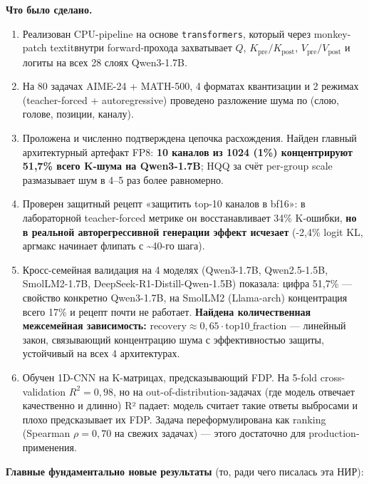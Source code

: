\documentclass[a4paper,12pt]{article}
\begin{document}
\textbf{Что было сделано.}
\begin{enumerate}[label=\arabic*.,leftmargin=*]
\item Реализован CPU-pipeline на основе \texttt{transformers}, который
  через monkey-patch textit{внутри}
  forward-прохода захватывает $Q$, $K_\text{pre}/K_\text{post}$,
  $V_\text{pre}/V_\text{post}$ и логиты на всех 28 слоях Qwen3-1.7B.
\item На 80 задачах AIME-24 + MATH-500, 4 форматах квантизации и
  2 режимах (teacher-forced + autoregressive) проведено разложение
  шума по (слою, голове, позиции, каналу).
\item Проложена и численно подтверждена цепочка расхождения. Найден
  главный архитектурный артефакт FP8: \textbf{10 каналов из 1024 (1\%)
  концентрируют 51,7\% всего K-шума на Qwen3-1.7B}; HQQ за счёт
  per-group scale размазывает шум в 4--5 раз более равномерно.
\item Проверен защитный рецепт «защитить top-10 каналов в bf16»: в
  лабораторной teacher-forced метрике он восстанавливает 34\% K-ошибки,
  \textbf{но в реальной авторегрессивной генерации эффект исчезает} (-2,4\%
  logit KL, аргмакс начинает флипать с \textasciitilde 40-го шага).
\item Кросс-семейная валидация на 4 моделях (Qwen3-1.7B, Qwen2.5-1.5B,
  SmolLM2-1.7B, DeepSeek-R1-Distill-Qwen-1.5B) показала: цифра 51,7\% ---
  свойство конкретно Qwen3-1.7B, на SmolLM2 (Llama-arch) концентрация
  всего 17\% и рецепт почти не работает. \textbf{Найдена количественная
  межсемейная зависимость:}
  \(\text{recovery} \approx 0{,}65 \cdot \text{top10\_fraction}\) ---
  линейный закон, связывающий концентрацию шума с эффективностью защиты,
  устойчивый на всех 4 архитектурах.
\item Обучен 1D-CNN на K-матрицах, предсказывающий FDP. На 5-fold
  cross-validation $R^2 = 0{,}98$, но на out-of-distribution-задачах
  (где модель отвечает качественно и длинно) R² падает: модель считает
  такие ответы выбросами и плохо предсказывает их FDP. Задача
  переформулирована как ranking (Spearman $\rho = 0{,}70$ на свежих
  задачах) — этого достаточно для production-применения.
\end{enumerate}

\textbf{Главные фундаментально новые результаты} (то, ради чего
писалась эта НИР):
\end{document}
